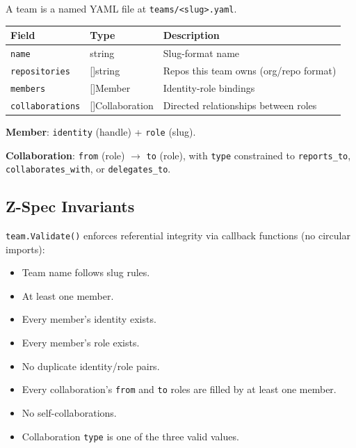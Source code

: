 \documentclass[a4paper,10pt]{article}
\newcommand{\field}[1]{\texttt{#1}}
\newcommand{\fpath}[1]{\texttt{#1}}
\begin{document}
A team is a named YAML file at \fpath{teams/<slug>.yaml}.

\begin{center}
\begin{tabular}{@{}llp{5.5cm}@{}}
\toprule
\textbf{Field} & \textbf{Type} & \textbf{Description} \\
\midrule
\field{name}           & string           & Slug-format name \\
\field{repositories}   & []string         & Repos this team owns
                                            (org/repo format) \\
\field{members}        & []Member         & Identity-role
                                            bindings \\
\field{collaborations} & []Collaboration  & Directed relationships
                                            between roles \\
\bottomrule
\end{tabular}
\end{center}

\textbf{Member}: \field{identity} (handle) + \field{role} (slug).

\textbf{Collaboration}: \field{from} (role) $\to$ \field{to} (role),
with \field{type} constrained to \texttt{reports\_to},
\texttt{collaborates\_with}, or \texttt{delegates\_to}.

\subsection{Z-Spec Invariants}

\texttt{team.Validate()} enforces referential integrity via
callback functions (no circular imports):

\begin{itemize}
  \item Team name follows slug rules.
  \item At least one member.
  \item Every member's identity exists.
  \item Every member's role exists.
  \item No duplicate identity/role pairs.
  \item Every collaboration's \field{from} and \field{to} roles are
    filled by at least one member.
  \item No self-collaborations.
  \item Collaboration \field{type} is one of the three valid values.
\end{itemize}
\end{document}
